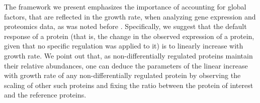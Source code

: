 The framework we present emphasizes the importance of accounting for global factors, that are reflected in the growth rate, when analyzing gene expression and proteomics data, as was noted before \cite{Wei_e_2015,Berthoumieux2013}.
Specifically, we suggest that the default response of a protein (that is, the change in the observed expression of a protein, given that no specific regulation was applied to it) is to linearly increase with growth rate.
We point out that, as non-differentially regulated proteins maintain their relative abundances, one can deduce the parameters of the linear increase with growth rate of any non-differentially regulated protein by observing the scaling of other such proteins and fixing the ratio between the protein of interest and the reference proteins.
